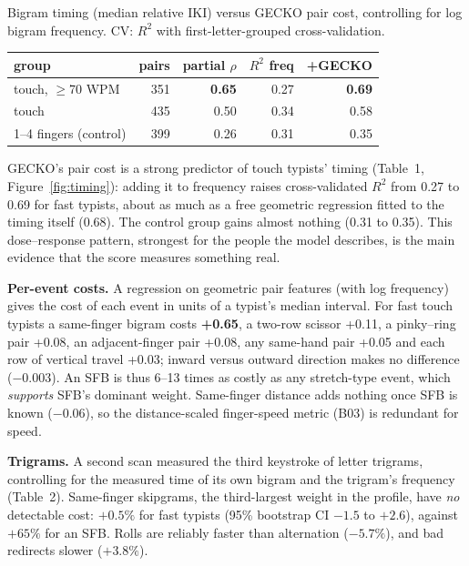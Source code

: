 \documentclass{gecko-paper}
\begin{document}
\begin{paperbody}

\begin{papertable}{Bigram timing (median relative IKI) versus GECKO pair cost, controlling for log bigram frequency. CV: $R^2$ with first-letter-grouped cross-validation.}
\begin{tabular*}{\linewidth}{@{\extracolsep{\fill}}lrrrr@{}}
\toprule
group & pairs & partial $\rho$ & $R^2$ freq & +GECKO\\
\midrule
touch, $\ge$70 WPM & 351 & \textbf{0.65} & 0.27 & \textbf{0.69}\\
touch & 435 & 0.50 & 0.34 & 0.58\\
1–4 fingers (control) & 399 & 0.26 & 0.31 & 0.35\\
\bottomrule
\end{tabular*}
\end{papertable}

GECKO's pair cost is a strong predictor of touch typists' timing (Table~1, Figure~\ref{fig:timing}): adding it to frequency raises cross-validated $R^2$ from 0.27 to 0.69 for fast typists, about as much as a free geometric regression fitted to the timing itself (0.68). The control group gains almost nothing (0.31 to 0.35). This dose–response pattern, strongest for the people the model describes, is the main evidence that the score measures something real.

\textbf{Per-event costs.} A regression on geometric pair features (with log frequency) gives the cost of each event in units of a typist's median interval. For fast touch typists a same-finger bigram costs \textbf{+0.65}, a two-row scissor +0.11, a pinky–ring pair +0.08, an adjacent-finger pair +0.08, any same-hand pair +0.05 and each row of vertical travel +0.03; inward versus outward direction makes no difference ($-0.003$). An SFB is thus 6–13 times as costly as any stretch-type event, which \emph{supports} SFB's dominant weight. Same-finger distance adds nothing once SFB is known ($-0.06$), so the distance-scaled finger-speed metric (B03) is redundant for speed.

\textbf{Trigrams.} A second scan measured the third keystroke of letter trigrams, controlling for the measured time of its own bigram and the trigram's frequency (Table~2). Same-finger skipgrams, the third-largest weight in the profile, have \emph{no} detectable cost: $+0.5\%$ for fast typists (95\% bootstrap CI $-1.5$ to $+2.6$), against $+65\%$ for an SFB. Rolls are reliably faster than alternation ($-5.7\%$), and bad redirects slower ($+3.8\%$).


\end{paperbody}
\end{document}
